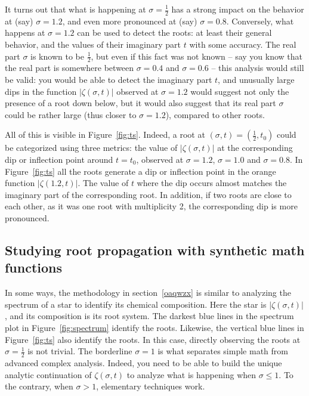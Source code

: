 \documentclass[oneside,10pt]{book}
\begin{document}
It turns out that what is happening at $\sigma=\frac{1}{2}$ has a strong impact on the behavior at (say) $\sigma=1.2$, and even more pronounced at (say) $\sigma=0.8$. Conversely, what happens at $\sigma=1.2$ can be used to detect the roots: at least their general behavior, and the values of their imaginary part $t$ with some accuracy. The real part $\sigma$ is known to be $\frac{1}{2}$, but even if this fact was not known -- say you know that the real part is somewhere between $\sigma=0.4$ and $\sigma=0.6$ -- this analysis would still be valid: you would be able to detect the imaginary part $t$, and unusually large dips in the function $|\zeta(\sigma, t)|$ observed at $\sigma=1.2$ would suggest not only the presence of a root down below, but it would also suggest that its real part $\sigma$ could be rather large (thus closer to $\sigma=1.2$), compared to other roots.

All of this is visible in Figure~\ref{fig:ts}. Indeed, a root at $(\sigma,t)=(\frac{1}{2},t_0)$ could be categorized using three metrics: the value of $|\zeta(\sigma,t)|$ at the corresponding dip  or inflection point around $t =t_0$, observed at $\sigma=1.2$, $\sigma=1.0$ and $\sigma=0.8$. In
 Figure~\ref{fig:ts} all the roots generate a dip or inflection point in the orange function
$|\zeta(1.2,t)|$.
The value of $t$ where the dip occurs almost matches the imaginary part of the corresponding root. In addition, if two roots are close to each other, as it was one root with multiplicity 2,
 the corresponding dip is more pronounced.



\subsection{Studying root propagation with synthetic math functions}

In some ways, the methodology in section~\ref{oaqwzx} is similar to analyzing the spectrum of a star to identify its chemical composition.
Here the star is $|\zeta(\sigma,t)|$, and its composition is its root system. The darkest blue lines in the spectrum plot in Figure~\ref{fig:spectrum}
 identify the roots. Likewise, the vertical blue lines in Figure~\ref{fig:ts} also identify the roots. In this case, directly observing the roots at $\sigma=\frac{1}{2}$ is not trivial. The borderline $\sigma=1$ is what separates
 simple math from advanced complex analysis. Indeed, you need to be able to build the unique analytic continuation of $\zeta(\sigma,t)$ to
 analyze what is happening when $\sigma\leq 1$. To the contrary, when $\sigma>1$, elementary techniques work.
\end{document}
